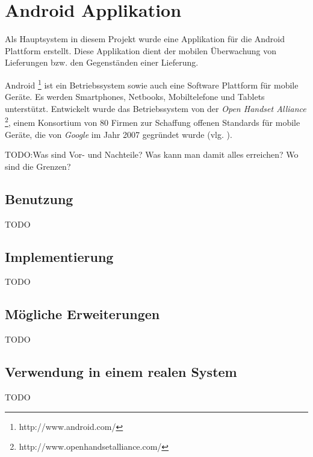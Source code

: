 \section{Android Applikation}
\label{sec:android}

Als Hauptsystem in diesem Projekt wurde eine Applikation für die Android
	Plattform erstellt. Diese Applikation dient der mobilen Überwachung
	von Lieferungen bzw. den Gegenständen einer Lieferung.

Android \footnote{http://www.android.com/} ist ein Betriebssystem sowie auch eine Software Plattform für mobile Geräte.
Es werden Smartphones, Netbooks, Mobiltelefone und Tablets unterstützt. Entwickelt wurde das Betriebssystem von der
\emph{Open Handset Alliance} \footnote{http://www.openhandsetalliance.com/}, einem Konsortium von 80 Firmen zur Schaffung offenen Standards 
für mobile Geräte, die von \emph{Google} im Jahr 2007 gegründet wurde (vlg. \cite{OHA07}). 



TODO:Was sind Vor- und Nachteile? Was kann man damit alles
	erreichen? Wo sind die Grenzen?
	
\subsection{Benutzung}

TODO	

\subsection{Implementierung}

TODO

\subsection{Mögliche Erweiterungen}

TODO

\subsection{Verwendung in einem realen System}

TODO